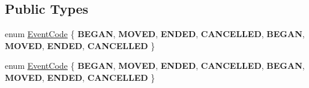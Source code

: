 \subsection*{Public Types}
\begin{DoxyCompactItemize}
\item 
enum \hyperlink{classEventTouch_a35816ad7349f0b7accc0a30a469b0087}{Event\+Code} \{ \newline
{\bfseries B\+E\+G\+AN}, 
{\bfseries M\+O\+V\+ED}, 
{\bfseries E\+N\+D\+ED}, 
{\bfseries C\+A\+N\+C\+E\+L\+L\+ED}, 
\newline
{\bfseries B\+E\+G\+AN}, 
{\bfseries M\+O\+V\+ED}, 
{\bfseries E\+N\+D\+ED}, 
{\bfseries C\+A\+N\+C\+E\+L\+L\+ED}
 \}
\item 
enum \hyperlink{classEventTouch_a35816ad7349f0b7accc0a30a469b0087}{Event\+Code} \{ \newline
{\bfseries B\+E\+G\+AN}, 
{\bfseries M\+O\+V\+ED}, 
{\bfseries E\+N\+D\+ED}, 
{\bfseries C\+A\+N\+C\+E\+L\+L\+ED}, 
\newline
{\bfseries B\+E\+G\+AN}, 
{\bfseries M\+O\+V\+ED}, 
{\bfseries E\+N\+D\+ED}, 
{\bfseries C\+A\+N\+C\+E\+L\+L\+ED}
 \}
\end{DoxyCompactItemize}
